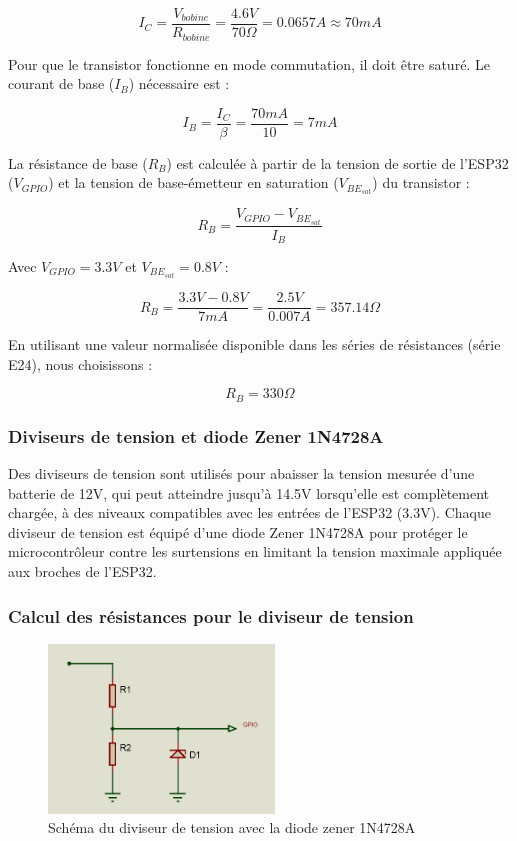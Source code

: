 \[
I_C = \frac{V_{bobine}}{R_{bobine}} = \frac{4.6V}{70\Omega} = 0.0657A \approx 70mA
\]

Pour que le transistor fonctionne en mode commutation, il doit être saturé. Le courant de base (\(I_B\)) nécessaire est :

\[
I_B = \frac{I_C}{\beta} = \frac{70mA}{10} = 7mA
\]

La résistance de base (\(R_B\)) est calculée à partir de la tension de sortie de l'ESP32 (\(V_{GPIO}\)) et la tension de base-émetteur en saturation (\(V_{BE_{sat}}\)) du transistor :

\[
R_B = \frac{V_{GPIO} - V_{BE_{sat}}}{I_B}
\]

Avec \(V_{GPIO} = 3.3V\) et \(V_{BE_{sat}} = 0.8V\) :

\[
R_B = \frac{3.3V - 0.8V}{7mA} = \frac{2.5V}{0.007A} = 357.14 \Omega
\]

En utilisant une valeur normalisée disponible dans les séries de résistances (série E24), nous choisissons :

\[
R_B = 330 \Omega
\]
\subsubsection*{Diviseurs de tension et diode Zener 1N4728A}

Des diviseurs de tension sont utilisés pour abaisser la tension mesurée d'une batterie de 12V, qui peut atteindre jusqu'à 14.5V lorsqu'elle est complètement chargée, à des niveaux compatibles avec les entrées de l'ESP32 (3.3V). Chaque diviseur de tension est équipé d'une diode Zener 1N4728A pour protéger le microcontrôleur contre les surtensions en limitant la tension maximale appliquée aux broches de l'ESP32.

\subsubsection*{Calcul des résistances pour le diviseur de tension}
\begin{figure}[H]
	\centering
	\includegraphics[width=6cm]{./img/composants/ddt.PNG}
	\caption{Schéma du diviseur de tension avec la diode zener 1N4728A}
	\label{fig:relais_5vdc}
\end{figure}


